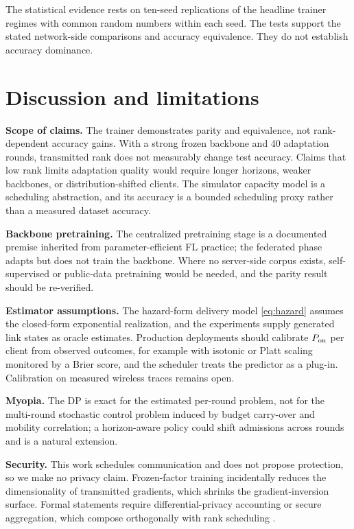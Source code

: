 \documentclass[preprint,12pt]{elsarticle}
\begin{document}
The statistical evidence rests on ten-seed replications of the headline trainer regimes with common random numbers within each seed. The tests support the stated network-side comparisons and accuracy equivalence. They do not establish accuracy dominance.

\section{Discussion and limitations}
\label{sec:discussion}
\textbf{Scope of claims.} The trainer demonstrates parity and equivalence, not rank-dependent accuracy gains. With a strong frozen backbone and 40 adaptation rounds, transmitted rank does not measurably change test accuracy. Claims that low rank limits adaptation quality would require longer horizons, weaker backbones, or distribution-shifted clients. The simulator capacity model is a scheduling abstraction, and its accuracy is a bounded scheduling proxy rather than a measured dataset accuracy.

\textbf{Backbone pretraining.} The centralized pretraining stage is a documented premise inherited from parameter-efficient FL practice; the federated phase adapts but does not train the backbone. Where no server-side corpus exists, self-supervised or public-data pretraining would be needed, and the parity result should be re-verified.

\textbf{Estimator assumptions.} The hazard-form delivery model \eqref{eq:hazard} assumes the closed-form exponential realization, and the experiments supply generated link states as oracle estimates. Production deployments should calibrate $P_{\rm on}$ per client from observed outcomes, for example with isotonic or Platt scaling monitored by a Brier score, and the scheduler treats the predictor as a plug-in. Calibration on measured wireless traces remains open.

\textbf{Myopia.} The DP is exact for the estimated per-round problem, not for the multi-round stochastic control problem induced by budget carry-over and mobility correlation; a horizon-aware policy could shift admissions across rounds and is a natural extension.

\textbf{Security.} This work schedules communication and does not propose protection, so we make no privacy claim. Frozen-factor training incidentally reduces the dimensionality of transmitted gradients, which shrinks the gradient-inversion surface. Formal statements require differential-privacy accounting or secure aggregation, which compose orthogonally with rank scheduling \cite{bonawitz2017secureagg,wei2023pfl_dp}.
\end{document}
